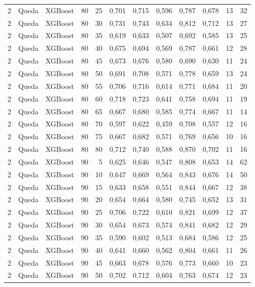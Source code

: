 \begin{longtable}{@{}rllrrrrrrrrr@{}}
2 & Queda & XGBoost & 80 & 25 & 0,701 & 0,715 & 0,596 & 0,787 & 0,678 & 13 & 32 \\
2 & Queda & XGBoost & 80 & 30 & 0,731 & 0,743 & 0,634 & 0,812 & 0,712 & 13 & 27 \\
2 & Queda & XGBoost & 80 & 35 & 0,619 & 0,633 & 0,507 & 0,692 & 0,585 & 13 & 25 \\
2 & Queda & XGBoost & 80 & 40 & 0,675 & 0,694 & 0,569 & 0,787 & 0,661 & 12 & 28 \\
2 & Queda & XGBoost & 80 & 45 & 0,673 & 0,676 & 0,580 & 0,690 & 0,630 & 11 & 24 \\
2 & Queda & XGBoost & 80 & 50 & 0,691 & 0,708 & 0,571 & 0,778 & 0,659 & 13 & 24 \\
2 & Queda & XGBoost & 80 & 55 & 0,706 & 0,716 & 0,614 & 0,771 & 0,684 & 11 & 20 \\
2 & Queda & XGBoost & 80 & 60 & 0,718 & 0,723 & 0,641 & 0,758 & 0,694 & 11 & 19 \\
2 & Queda & XGBoost & 80 & 65 & 0,667 & 0,680 & 0,585 & 0,774 & 0,667 & 11 & 14 \\
2 & Queda & XGBoost & 80 & 70 & 0,597 & 0,622 & 0,459 & 0,708 & 0,557 & 12 & 16 \\
2 & Queda & XGBoost & 80 & 75 & 0,667 & 0,682 & 0,571 & 0,769 & 0,656 & 10 & 16 \\
2 & Queda & XGBoost & 80 & 80 & 0,712 & 0,740 & 0,588 & 0,870 & 0,702 & 11 & 16 \\
2 & Queda & XGBoost & 90 & 5 & 0,625 & 0,646 & 0,547 & 0,808 & 0,653 & 14 & 62 \\
2 & Queda & XGBoost & 90 & 10 & 0,647 & 0,669 & 0,564 & 0,843 & 0,676 & 14 & 50 \\
2 & Queda & XGBoost & 90 & 15 & 0,633 & 0,658 & 0,551 & 0,844 & 0,667 & 12 & 38 \\
2 & Queda & XGBoost & 90 & 20 & 0,654 & 0,664 & 0,580 & 0,745 & 0,652 & 13 & 31 \\
2 & Queda & XGBoost & 90 & 25 & 0,706 & 0,722 & 0,610 & 0,821 & 0,699 & 12 & 37 \\
2 & Queda & XGBoost & 90 & 30 & 0,654 & 0,673 & 0,574 & 0,841 & 0,682 & 12 & 29 \\
2 & Queda & XGBoost & 90 & 35 & 0,590 & 0,602 & 0,513 & 0,684 & 0,586 & 12 & 25 \\
2 & Queda & XGBoost & 90 & 40 & 0,641 & 0,660 & 0,562 & 0,804 & 0,661 & 11 & 26 \\
2 & Queda & XGBoost & 90 & 45 & 0,663 & 0,678 & 0,576 & 0,773 & 0,660 & 10 & 23 \\
2 & Queda & XGBoost & 90 & 50 & 0,702 & 0,712 & 0,604 & 0,763 & 0,674 & 12 & 23 \\

\end{longtable}
